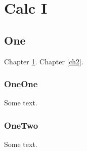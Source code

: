 \documentclass[openany]{book}
\begin{document}
\setcounter{part}{0}
\setcounter{chapter}{0}
\part{Calc I}
\chapter{One}\label{ch1}
Chapter \ref{ch1}.  Chapter \ref{ch2}.
\section{OneOne}
Some text.
\section{OneTwo}
Some text.
\end{document}

